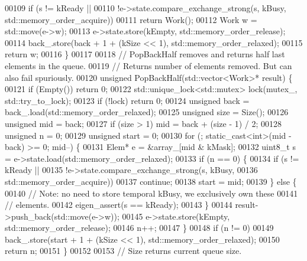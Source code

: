\begin{DoxyCode}
00109     \textcolor{keywordflow}{if} (s != kReady ||
00110         !e->state.compare\_exchange\_strong(s, kBusy, std::memory\_order\_acquire))
00111       \textcolor{keywordflow}{return} Work();
00112     Work w = std::move(e->w);
00113     e->state.store(kEmpty, std::memory\_order\_release);
00114     back\_.store(back + 1 + (kSize << 1), std::memory\_order\_relaxed);
00115     \textcolor{keywordflow}{return} w;
00116   \}
00117 
00118   \textcolor{comment}{// PopBackHalf removes and returns half last elements in the queue.}
00119   \textcolor{comment}{// Returns number of elements removed. But can also fail spuriously.}
00120   \textcolor{keywordtype}{unsigned} PopBackHalf(std::vector<Work>* result) \{
00121     \textcolor{keywordflow}{if} (Empty()) \textcolor{keywordflow}{return} 0;
00122     std::unique\_lock<std::mutex> lock(mutex\_, std::try\_to\_lock);
00123     \textcolor{keywordflow}{if} (!lock) \textcolor{keywordflow}{return} 0;
00124     \textcolor{keywordtype}{unsigned} back = back\_.load(std::memory\_order\_relaxed);
00125     \textcolor{keywordtype}{unsigned} size = Size();
00126     \textcolor{keywordtype}{unsigned} mid = back;
00127     \textcolor{keywordflow}{if} (size > 1) mid = back + (size - 1) / 2;
00128     \textcolor{keywordtype}{unsigned} n = 0;
00129     \textcolor{keywordtype}{unsigned} start = 0;
00130     \textcolor{keywordflow}{for} (; \textcolor{keyword}{static\_cast<}\textcolor{keywordtype}{int}\textcolor{keyword}{>}(mid - back) >= 0; mid--) \{
00131       Elem* e = &array\_[mid & kMask];
00132       uint8\_t s = e->state.load(std::memory\_order\_relaxed);
00133       \textcolor{keywordflow}{if} (n == 0) \{
00134         \textcolor{keywordflow}{if} (s != kReady ||
00135             !e->state.compare\_exchange\_strong(s, kBusy,
00136                                               std::memory\_order\_acquire))
00137           \textcolor{keywordflow}{continue};
00138         start = mid;
00139       \} \textcolor{keywordflow}{else} \{
00140         \textcolor{comment}{// Note: no need to store temporal kBusy, we exclusively own these}
00141         \textcolor{comment}{// elements.}
00142         eigen\_assert(s == kReady);
00143       \}
00144       result->push\_back(std::move(e->w));
00145       e->state.store(kEmpty, std::memory\_order\_release);
00146       n++;
00147     \}
00148     \textcolor{keywordflow}{if} (n != 0)
00149       back\_.store(start + 1 + (kSize << 1), std::memory\_order\_relaxed);
00150     \textcolor{keywordflow}{return} n;
00151   \}
00152 
00153   \textcolor{comment}{// Size returns current queue size.}

\end{DoxyCode}
